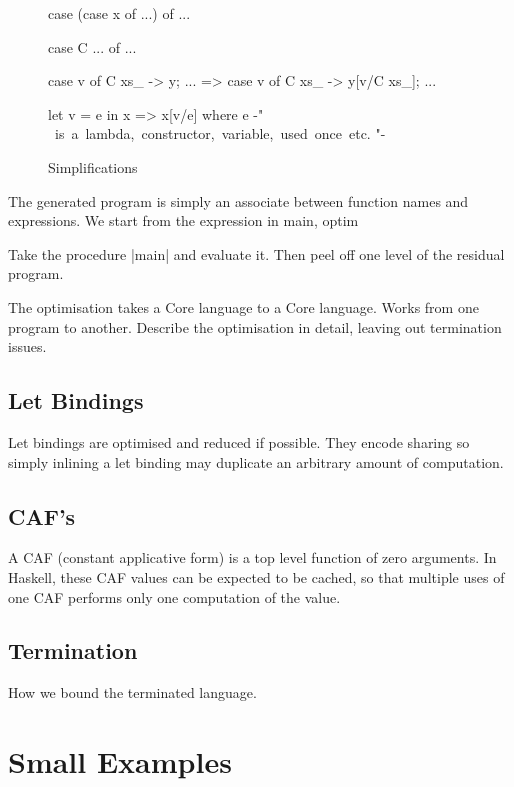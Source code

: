\documentclass{llncs}
\begin{document}
\begin{figure}[tb]
\begin{code}
case (case x of ...) of ...

case C ... of ...

case v of {C xs_ -> y; ...} => case v of {C xs_ -> y[v/C xs_]; ...}

let v = e in x => x[v/e]
   where e {-" \hbox{ is a lambda, constructor, variable, used once etc.} "-}
\end{code}
\caption{Simplifications}
\label{fig:simplify}
\end{figure}

The generated program is simply an associate between function names and expressions. We start from the expression in main, optim

Take the procedure |main| and evaluate it. Then peel off one level of the residual program.





The optimisation takes a Core language to a Core language. Works from one program to another. Describe the optimisation in detail, leaving out termination issues.

\subsection{Let Bindings}

Let bindings are optimised and reduced if possible. They encode sharing so simply inlining a let binding may duplicate an arbitrary amount of computation.

\subsection{CAF's}
\label{sec:caf}

A CAF (constant applicative form) is a top level function of zero arguments. In Haskell, these CAF values can be expected to be cached, so that multiple uses of one CAF performs only one computation of the value.


\subsection{Termination}

How we bound the terminated language.

\section{Small Examples}
\end{document}
